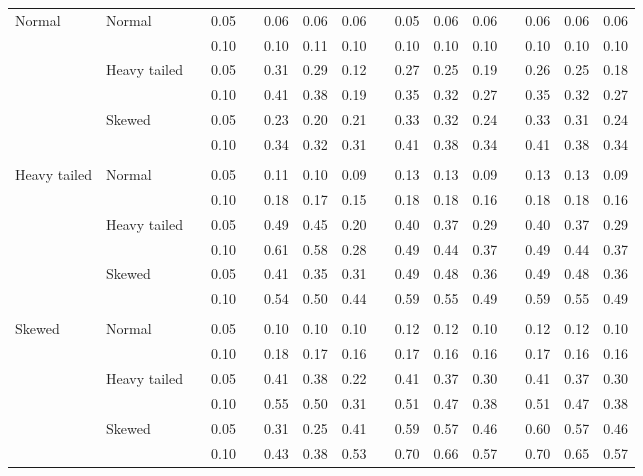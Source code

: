 \begin{table}[ht]
\begin{scriptsize}
\begin{tabular}{ll p{.1cm} c p{.1cm} rrr p{.1cm} rrr p{.1cm} rrr}
\rowcolor{gray!20}Normal       & Normal       && 0.05 &&   0.06 & 0.06 & 0.06 && 0.05 & 0.06 & 0.06 && 0.06 & 0.06 & 0.06 \\ 
\rowcolor{gray!20}             &              && 0.10 &&   0.10 & 0.11 & 0.10 && 0.10 & 0.10 & 0.10 && 0.10 & 0.10 & 0.10 \\ 
\rowcolor{gray!20}             & Heavy tailed && 0.05 &&   0.31 & 0.29 & 0.12 && 0.27 & 0.25 & 0.19 && 0.26 & 0.25 & 0.18 \\ 
\rowcolor{gray!20}             &              && 0.10 &&   0.41 & 0.38 & 0.19 && 0.35 & 0.32 & 0.27 && 0.35 & 0.32 & 0.27 \\ 
\rowcolor{gray!20}             & Skewed       && 0.05 &&   0.23 & 0.20 & 0.21 && 0.33 & 0.32 & 0.24 && 0.33 & 0.31 & 0.24 \\ 
\rowcolor{gray!20}             &              && 0.10 &&   0.34 & 0.32 & 0.31 && 0.41 & 0.38 & 0.34 && 0.41 & 0.38 & 0.34 \\ 
             &&&&&&&&&&&&&&&\\
Heavy tailed & Normal       && 0.05 &&   0.11 & 0.10 & 0.09 && 0.13 & 0.13 & 0.09 && 0.13 & 0.13 & 0.09 \\ 
             &              && 0.10 &&   0.18 & 0.17 & 0.15 && 0.18 & 0.18 & 0.16 && 0.18 & 0.18 & 0.16 \\ 
             & Heavy tailed && 0.05 &&   0.49 & 0.45 & 0.20 && 0.40 & 0.37 & 0.29 && 0.40 & 0.37 & 0.29 \\ 
             &              && 0.10 &&   0.61 & 0.58 & 0.28 && 0.49 & 0.44 & 0.37 && 0.49 & 0.44 & 0.37 \\ 
             & Skewed       && 0.05 &&   0.41 & 0.35 & 0.31 && 0.49 & 0.48 & 0.36 && 0.49 & 0.48 & 0.36 \\ 
             &              && 0.10 &&   0.54 & 0.50 & 0.44 && 0.59 & 0.55 & 0.49 && 0.59 & 0.55 & 0.49 \\
             &&&&&&&&&&&&&&&\\ 
Skewed       & Normal       && 0.05 &&   0.10 & 0.10 & 0.10 && 0.12 & 0.12 & 0.10 && 0.12 & 0.12 & 0.10 \\ 
             &              && 0.10 &&   0.18 & 0.17 & 0.16 && 0.17 & 0.16 & 0.16 && 0.17 & 0.16 & 0.16 \\ 
             & Heavy tailed && 0.05 &&   0.41 & 0.38 & 0.22 && 0.41 & 0.37 & 0.30 && 0.41 & 0.37 & 0.30 \\ 
             &              && 0.10 &&   0.55 & 0.50 & 0.31 && 0.51 & 0.47 & 0.38 && 0.51 & 0.47 & 0.38 \\ 
             & Skewed       && 0.05 &&   0.31 & 0.25 & 0.41 && 0.59 & 0.57 & 0.46 && 0.60 & 0.57 & 0.46 \\ 
             &              && 0.10 &&   0.43 & 0.38 & 0.53 && 0.70 & 0.66 & 0.57 && 0.70 & 0.65 & 0.57 \\ 


\end{tabular}
\end{scriptsize}
\end{table}
